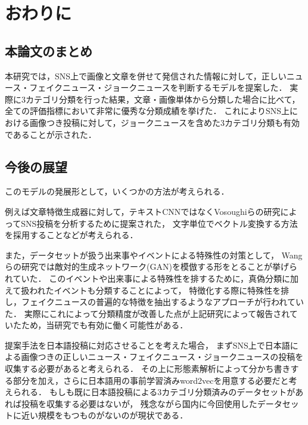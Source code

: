 %
\chapter{おわりに}
%
\section{本論文のまとめ}
本研究では，SNS上で画像と文章を併せて発信された情報に対して，正しいニュース・フェイクニュース・ジョークニュースを判断するモデルを提案した．
実際に3カテゴリ分類を行った結果，文章・画像単体から分類した場合に比べて，全ての評価指標において非常に優秀な分類成績を挙げた．
これによりSNS上における画像つき投稿に対して，ジョークニュースを含めた3カテゴリ分類も有効であることが示された．
%
\section{今後の展望}
このモデルの発展形として，いくつかの方法が考えられる．

例えば文章特徴生成器に対して，テキストCNNではなくVosoughiらの研究\cite{Vosoughi:2016:TLT:2911451.2914762}によってSNS投稿を分析するために提案された，
文字単位でベクトル変換する方法を採用することなどが考えられる．

また，データセットが扱う出来事やイベントによる特殊性の対策として，
Wangらの研究\cite{wang2018eann}では敵対的生成ネットワーク(GAN)を模倣する形をとることが挙げられていた．
このイベントや出来事による特殊性を排するために，真偽分類に加えて扱われたイベントも分類することによって，
特徴化する際に特殊性を排し，フェイクニュースの普遍的な特徴を抽出するようなアプローチが行われていた．
実際にこれによって分類精度が改善した点が上記研究によって報告されていたため，当研究でも有効に働く可能性がある．

提案手法を日本語投稿に対応させることを考えた場合，
まずSNS上で日本語による画像つきの正しいニュース・フェイクニュース・ジョークニュースの投稿を収集する必要があると考えられる．
その上に形態素解析によって分かち書きする部分を加え，さらに日本語用の事前学習済みword2vecを用意する必要だと考えられる．
もしも既に日本語投稿による3カテゴリ分類済みのデータセットがあれば投稿を収集する必要はないが，
残念ながら国内に今回使用したデータセットに近い規模をもつものがないのが現状である．

% 
